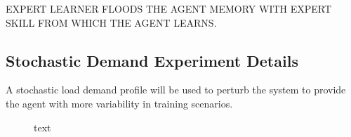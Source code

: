 EXPERT LEARNER FLOODS THE AGENT MEMORY WITH EXPERT SKILL FROM WHICH THE AGENT LEARNS.

\subsection{Stochastic Demand Experiment Details}\label{sec:stochastic}
A stochastic load demand profile will be used to perturb the system to provide the agent with more variability in training scenarios.

\begin{figure}[h]
	\centering
	
	\caption{text}
\end{figure}

